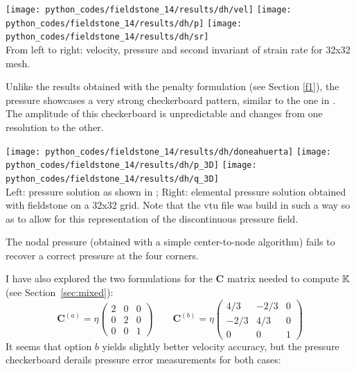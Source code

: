\begin{center}
\texttt{[image: python\_codes/fieldstone\_14/results/dh/vel]}
\texttt{[image: python\_codes/fieldstone\_14/results/dh/p]}
\texttt{[image: python\_codes/fieldstone\_14/results/dh/sr]}\\
{\captionfont From left to right: velocity, pressure and second invariant 
of strain rate for 32x32 mesh.}
\end{center}

Unlike the results obtained with the penalty formulation (see Section \ref{f1}),
the pressure showcases a very strong checkerboard pattern, similar to the one 
in \cite{dohu03}. The amplitude of this checkerboard is unpredictable 
and changes from one resolution to the other.

\begin{center}
\texttt{[image: python\_codes/fieldstone\_14/results/dh/doneahuerta]}
\texttt{[image: python\_codes/fieldstone\_14/results/dh/p\_3D]}
\texttt{[image: python\_codes/fieldstone\_14/results/dh/q\_3D]}\\
{\captionfont Left: pressure solution as shown in \cite{dohu03}; Right: elemental 
pressure solution obtained with fieldstone on a 32x32 grid. 
Note that the vtu file was build in such a way so as to allow for 
this representation of the discontinuous pressure field.}
\end{center}

The nodal pressure (obtained with a simple center-to-node algorithm)
fails to recover a correct pressure at the four corners.

I have also explored the two formulations for the ${\bm C}$ matrix needed to 
compute ${\mathbb{K}}$ (see Section~\ref{sec:mixed}):
\[
{\bm C}^{(a)}= \eta 
\left(
\begin{array}{ccc}
2 & 0 & 0 \\
0 & 2 & 0 \\
0 & 0 & 1
\end{array}
\right)
\qquad
{\bm C}^{(b)}= \eta
\left(
\begin{array}{ccc}
4/3 & -2/3 & 0 \\
-2/3 & 4/3 & 0 \\
0 & 0 & 1
\end{array}
\right)
\]
It seems that option $b$ yields slightly better velocity accuracy, but the pressure 
checkerboard derails pressure error measurements for both cases:

